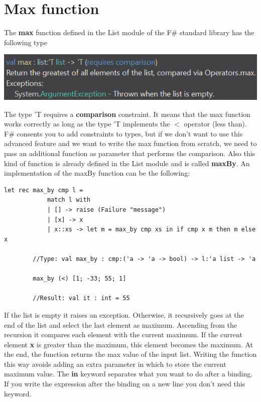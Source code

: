     \section{Max function}
    The \textbf{max} function defined in the List module of the F\# standard library has the following type
    \begin{center}
        \includegraphics[]{images/MAx type.png}
    \end{center}
    The type 'T requires a \textbf{comparison} constraint. It means that the max function works correctly as long as the type 'T implements the $<$ operator (less than). F\# consents you to add constraints to types, but if we don't want to use this advanced feature and we want to write the max function from scratch, we need to pass an additional function as parameter that performs the comparison. Also this kind of function is already defined in the List module and is called \textbf{maxBy}.\newline\newline
    An implementation of the maxBy function can be the following:
    \begin{lstlisting}[style = FSharpStyle]
        let rec max_by cmp l =
            match l with
            | [] -> raise (Failure "message")
            | [x] -> x
            | x::xs -> let m = max_by cmp xs in if cmp x m then m else x

        //Type: val max_by : cmp:('a -> 'a -> bool) -> l:'a list -> 'a

        max_by (<) [1; -33; 55; 1]

        //Result: val it : int = 55
    \end{lstlisting}
    If the list is empty it raises an exception. Otherwise, it recursively goes at the end of the list and select the last element as maximum. Ascending from the recursion it compares each element with the current maximum. If the current element \textbf{x} is greater than the maximum, this element becomes the maximum. At the end, the function returns the max value of the input list. Writing the function this way avoids adding an extra parameter in which to store the current maximum value.\newline\newline
    The \textbf{in} keyword separates what you want to do after a binding. If you write the expression after the binding on a new line you don't need this keyword.
